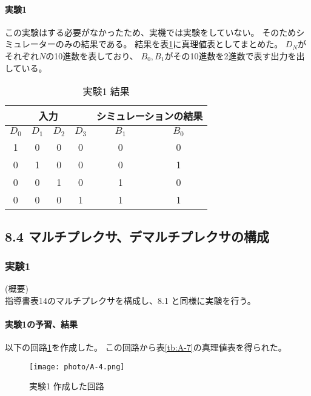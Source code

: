 \documentclass[dvipdfmx]{jsarticle}
\begin{document}
\paragraph*{実験1}
この実験はする必要がなかったため、実機では実験をしていない。
そのためシミュレーターのみの結果である。
結果を表\ref*{tb:A-6}に真理値表としてまとめた。
$D_N$がそれぞれ$N$の10進数を表しており、
$B_0, B_1$がその10進数を2進数で表す出力を出している。

\begin{table}[hbtp]
  \centering
  \caption{実験1 結果}
  \begin{tabular}{|c|c|c|c||c|c|} \hline
    \multicolumn{4}{|c||}{入力} & \multicolumn{2}{c|}{シミュレーションの結果} \\ \hline
    $D_0$ & $D_1$ & $D_2$ & $D_3$ & $B_1$ & $B_0$ \\ \hline
    1 & 0 & 0 & 0 & 0 & 0 \\ \hline
    0 & 1 & 0 & 0 & 0 & 1 \\ \hline
    0 & 0 & 1 & 0 & 1 & 0 \\ \hline
    0 & 0 & 0 & 1 & 1 & 1 \\ \hline
  \end{tabular}
  \label{tb:A-6}
\end{table}

\subsection{8.4 マルチプレクサ、デマルチプレクサの構成}

\subsubsection{実験1}
(概要)\\
指導書\cite[p.3-12]{degital}表14のマルチプレクサを構成し、8.1 と同様に実験を行う。

\paragraph*{実験1の予習、結果}
以下の回路\ref*{fig:A-4}を作成した。
この回路から表\ref*{tb:A-7}の真理値表を得られた。
\begin{figure}[hbtp]
  \begin{center}
    \texttt{[image: photo/A-4.png]}
  \end{center}
  \caption{実験1 作成した回路}
  \label{fig:A-4}
\end{figure}
\end{document}

